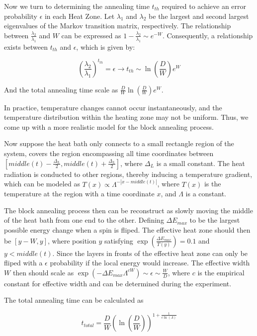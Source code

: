 \documentclass[twocolumn,superscriptaddress,english,showpacs,longbibliography]{revtex4-2}
\begin{document}
Now we turn to determining the annealing time $t_{th}$ required to achieve an error probability $\epsilon$ in each Heat Zone. Let $\lambda_1$ and $\lambda_2$ be the largest and second largest eigenvalues of the Markov transition matrix, respectively. The relationship between $\frac{\lambda_2}{\lambda_1}$ and $W$ can be expressed as $1 - \frac{\lambda_2}{\lambda_1} \sim e^{-W}$. Consequently, a relationship exists between $t_{th}$ and $\epsilon$, which is given by:

\begin{equation}
    \left( \frac{\lambda_2}{\lambda_1} \right) ^ {t_{th}} = \epsilon \rightarrow t_{th} \sim \ln(\frac{D}{W})e^{W}
\end{equation}

And the total annealing time scale as $\frac{D}{W}\ln(\frac{D}{W})e^W$.

In practice, temperature changes cannot occur instantaneously, and the temperature distribution within the heating zone may not be uniform.
Thus, we come up with a more realistic model for the block annealing process.

Now suppose the heat bath only connects to a small rectangle region of the system,
covers the region encompassing all time coordinates between $[middle(t)-\frac{\Delta_L}{2}, middle(t)+\frac{\Delta_L}{2}]$, where $\Delta_L$ is a small constant.
The heat radiation is conducted to other regions, thereby inducing a temperature gradient,
which can be modeled as $T(x) \propto \Lambda^{-|x - middle(t)|}$, where $T(x)$ is the temperature at the region with a time coordinate $x$, and $\Lambda$ is a constant.

The block annealing process then can be reconstruct as slowly moving
the middle of the heat bath from one end to the other. Defining $\Delta E_{max}$ to be the
largest possible energy change when a spin is fliped.
The effective heat zone should then be $[y-W, y]$, where position $y$ satisfying 
$\exp(\frac{\Delta E_{max}}{T(y)}) = 0.1$ and $y<middle(t)$. Since the layers
in fronts of the effective heat zone can only be fliped with a $\epsilon$ probability if the local energy would increase. 
The effective width $W$ then should scale as $\exp(-\Delta E_{max} \Lambda^{cW}) \sim \epsilon \sim \frac{W}{D}$, where $c$ is the empirical constant for effective width and can be determined during the experiment. 

The total annealing time can be calculated as 

\begin{equation}
    \label{eq:total-annealing-time}
    t_{total} = \frac{D}{W}(\ln(\frac{D}{W}))^{1+ \frac{1}{c\ln(\Lambda)}}
\end{equation}
\end{document}
